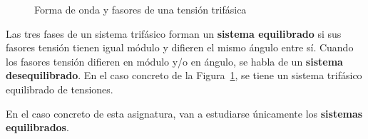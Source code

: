 \documentclass[11pt]{book} %
\begin{document}
	\begin{figure}
		\centering
		 \hfill
		\caption{Forma de onda y fasores de una tensión trifásica}
		\label{fig.tensiontrifasica}
	\end{figure}
	
	Las tres fases de un sistema trifásico forman un \textbf{sistema equilibrado} si sus fasores tensión tienen igual módulo y difieren el mismo ángulo entre sí. Cuando los fasores tensión difieren en módulo
	y/o en ángulo, se habla de un \textbf{sistema desequilibrado}. En el caso concreto de la Figura~\ref{fig.tensiontrifasica}, se tiene un sistema trifásico equilibrado de tensiones. 
	\begin{remark}
		En el caso concreto de esta asignatura, van a estudiarse únicamente los \textbf{sistemas equilibrados}.
	\end{remark}
	
\end{document}

